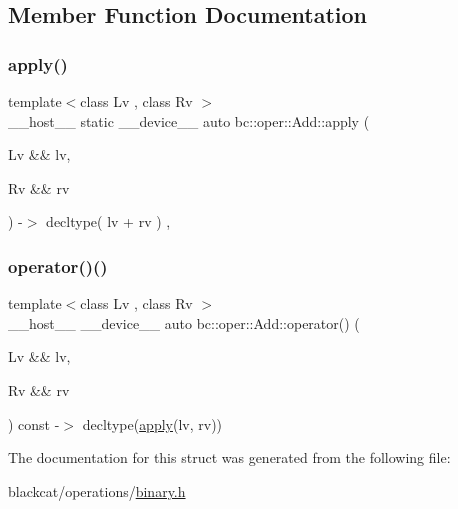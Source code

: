 \subsection{Member Function Documentation}
\mbox{\label{structbc_1_1oper_1_1Add_a2cf484e25e4aa7d787f85da0f9807fd4}} 
\subsubsection{\texorpdfstring{apply()}{apply()}}
{\footnotesize\ttfamily template$<$class Lv , class Rv $>$ \\
\+\_\+\+\_\+host\+\_\+\+\_\+ static \+\_\+\+\_\+device\+\_\+\+\_\+ auto bc\+::oper\+::\+Add\+::apply (\begin{DoxyParamCaption}\item[{Lv \&\&}]{lv,  }\item[{Rv \&\&}]{rv }\end{DoxyParamCaption}) -\/$>$ decltype( lv + rv ) \hspace{0.3cm}{\ttfamily [inline]}, {\ttfamily [static]}}

\mbox{\label{structbc_1_1oper_1_1Add_af3d71f0cd740124171f9a92162125068}} 
\subsubsection{\texorpdfstring{operator()()}{operator()()}}
{\footnotesize\ttfamily template$<$class Lv , class Rv $>$ \\
\+\_\+\+\_\+host\+\_\+\+\_\+ \+\_\+\+\_\+device\+\_\+\+\_\+ auto bc\+::oper\+::\+Add\+::operator() (\begin{DoxyParamCaption}\item[{Lv \&\&}]{lv,  }\item[{Rv \&\&}]{rv }\end{DoxyParamCaption}) const -\/$>$ decltype(\hyperlink{structbc_1_1oper_1_1Add_a2cf484e25e4aa7d787f85da0f9807fd4}{apply}(lv, rv)) \hspace{0.3cm}{\ttfamily [inline]}}



The documentation for this struct was generated from the following file\+:\begin{DoxyCompactItemize}
\item 
blackcat/operations/\hyperlink{binary_8h}{binary.\+h}\end{DoxyCompactItemize}

